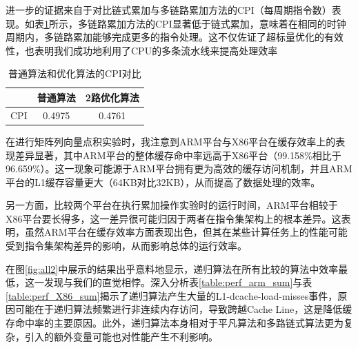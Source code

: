 \documentclass[a4paper]{article}
\begin{document}
进一步的证据来自于对比链式累加与多链路累加方法的CPI（每周期指令数）表现。如表\ref{tab:cpi1}所示，多链路累加方法的CPI显著低于链式累加，意味着在相同的时钟周期内，多链路累加能够完成更多的指令处理。这不仅佐证了超标量优化的有效性，也表明我们成功地利用了CPU的多条流水线来提高处理效率
                    \begin{table}[htbp]
                    \centering
                    \caption{普通算法和优化算法的CPI对比}
                    \label{tab:cpi1}
                    \begin{tabular}{@{}lcc@{}}
                    \toprule
                     & 普通算法  & 2路优化算法 \\ \midrule
                    CPI & 0.4975 & 0.4761 \\ \bottomrule
                    \end{tabular}
                    \end{table}
                    

在进行矩阵列向量点积实验时，我注意到ARM平台与X86平台在缓存效率上的表现差异显著，其中ARM平台的整体缓存命中率远高于X86平台（99.158\%相比于96.659\%）。这一现象可能源于ARM平台拥有更为高效的缓存访问机制，并且ARM平台的L1缓存容量更大（64KB对比32KB），从而提高了数据处理的效率。

另一方面，比较两个平台在执行累加操作实验时的运行时间，ARM平台相较于X86平台要长得多，这一差异很可能归因于两者在指令集架构上的根本差异。这表明，虽然ARM平台在缓存效率方面表现出色，但其在某些计算任务上的性能可能受到指令集架构差异的影响，从而影响总体的运行效率。


在图\ref{fig:all2}中展示的结果出乎意料地显示，递归算法在所有比较的算法中效率最低，这一发现与我们的直觉相悖。深入分析表\ref{table:perf_arm_sum}与表\ref{table:perf_X86_sum}揭示了递归算法产生大量的L1-dcache-load-misses事件，原因可能在于递归算法频繁进行非连续内存访问，导致跨越Cache Line，这是降低缓存命中率的主要原因。此外，递归算法本身相对于平凡算法和多路链式算法更为复杂，引入的额外变量可能也对性能产生不利影响。
\end{document}
